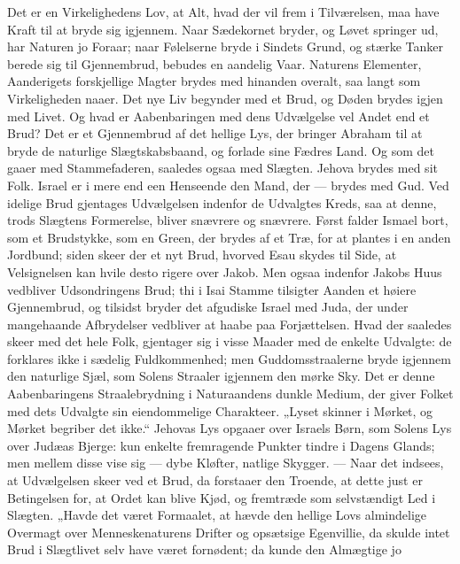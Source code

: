 \documentclass[12pt,a4paper]{book}
\begin{document}
Det er en Virkelighedens Lov, at Alt, hvad der vil frem i Tilværelsen, maa have
Kraft til at bryde sig igjennem. Naar Sædekornet bryder, og Løvet springer ud,
har Naturen jo
Foraar; naar Følelserne bryde i Sindets Grund, og stærke Tanker berede sig til
Gjennembrud, bebudes en aandelig Vaar. Naturens Elementer, Aanderigets
forskjellige Magter brydes med hinanden overalt, saa langt som Virkeligheden
naaer. Det nye Liv begynder med et Brud, og Døden brydes igjen med Livet. Og
hvad er Aabenbaringen med dens Udvælgelse vel Andet end et Brud? Det er et
Gjennembrud af det hellige Lys, der bringer Abraham til at bryde de naturlige
Slægtskabsbaand, og forlade sine Fædres Land. Og som det gaaer med
Stammefaderen, saaledes ogsaa med Slægten. Jehova brydes med sit Folk. Israel
er i mere end een Henseende den Mand, der --- brydes med Gud. Ved idelige Brud
gjentages Udvælgelsen indenfor de Udvalgtes Kreds, saa at denne, trods Slægtens
Formerelse, bliver snævrere og snævrere. Først falder Ismael bort, som et
Brudstykke, som en Green, der brydes af et Træ, for at plantes i en anden
Jordbund; siden skeer der et nyt Brud, hvorved Esau skydes til Side, at
Velsignelsen kan hvile desto rigere over Jakob. Men ogsaa indenfor Jakobs Huus
vedbliver Udsondringens Brud; thi i Isai Stamme tilsigter Aanden et høiere
Gjennembrud, og tilsidst bryder det afgudiske Israel med Juda, der under
mangehaande Afbrydelser vedbliver at haabe paa Forjættelsen. Hvad der saaledes
skeer med det hele Folk, gjentager sig i visse Maader med de enkelte Udvalgte:
de forklares ikke i sædelig Fuldkommenhed; men Guddomsstraalerne bryde igjennem
den naturlige Sjæl, som Solens Straaler igjennem den mørke Sky. Det er denne
Aabenbaringens Straalebrydning i Naturaandens dunkle Medium, der giver Folket
med dets Udvalgte sin eiendommelige Charakteer. „Lyset skinner i Mørket, og
Mørket begriber det ikke.“ Jehovas Lys opgaaer over Israels Børn, som Solens Lys
over Judæas Bjerge: kun enkelte fremragende Punkter tindre i Dagens Glands; men
mellem disse vise sig --- dybe Kløfter, natlige Skygger. --- Naar det indsees,
at Udvælgelsen skeer ved et Brud, da forstaaer den Troende, at dette just er
Betingelsen for, at Ordet kan blive Kjød, og fremtræde som selvstændigt Led i
Slægten. „Havde det været Formaalet, at hævde den hellige Lovs almindelige
Overmagt over Menneskenaturens Drifter og opsætsige Egenvillie, da skulde intet
Brud i Slægtlivet selv have været fornødent; da kunde den Almægtige jo
\end{document}
